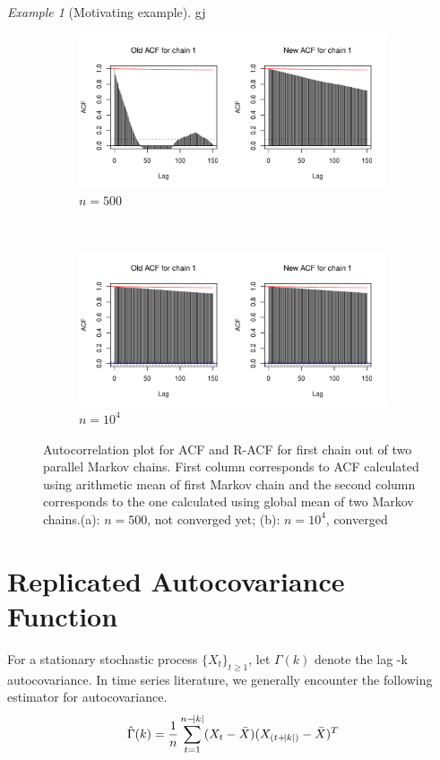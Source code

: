 \documentclass[11pt]{article}
\theoremstyle{remark}
\newtheorem{example}{Example}
\begin{document}
\begin{example}[Motivating example]
  gj
\begin{figure}
\begin{subfigure}{\textwidth}
  \centering
  \includegraphics[width=.8\linewidth]{plots/acf,n=500.pdf}
  \caption{$n = 500$}
  \label{subfig:acf-500}
\end{subfigure}\\
\begin{subfigure}{\textwidth}
  \centering
  \includegraphics[width=.8\linewidth]{plots/acf,n=10000.pdf} 
  \caption{$n = 10^4$}
  \label{subfig:acf-5e4}
\end{subfigure}
\caption{Autocorrelation plot for ACF and R-ACF for first chain out of two parallel Markov chains. First column corresponds to ACF calculated using arithmetic mean of first Markov chain and the second column corresponds to the one calculated using global mean of two Markov chains.(a): $n = 500$, not converged yet; (b): $n =  10^4$, converged}
\label{fig:var_acf_ccf}
\end{figure}

\end{example}
\section{Replicated Autocovariance Function} \label{sec:R-ACF}

For a stationary stochastic process $\{X_t\}_{t \geq 1}$, let $\Gamma(k)$ denote the lag -k autocovariance. In time series literature, we generally encounter the following estimator for autocovariance. 
%
\[
\hat{\Gamma}(k) = \dfrac{1}{n}\sum_{t=1}^{n-\abs{k}}(X_t - \bar{X})(X_{(t+\abs{k})} - \bar{X})^T
\]
\end{document}
